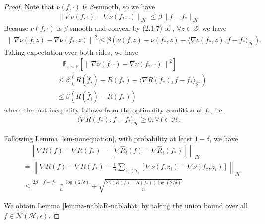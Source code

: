 \documentclass{article}
\begin{document}
\begin{proof}
  Note that $\nu(f,\cdot)$ is $\beta$-smooth,
  so we have
  \begin{align}
    \|\nabla\nu(f,\cdot)-\nabla\nu(f_\ast,\cdot)\|_\mathcal{H} \leq \beta\|f-f_\ast\|_\mathcal{H}
  \end{align}
  Because $\nu(f,\cdot)$ is $\beta$-smooth and convex, by (2.1.7) of \cite{Nesterov2004},
  $\forall z\in\mathcal{Z}$,
  we have
  \begin{align*}
   \left\|\nabla\nu (f,z)-\nabla \nu (f_\ast,z)\right\|^2
    \leq
    \beta\left(\nu (f,z)-\nu (f_\ast,z)
    -\langle \nabla\nu (f_\ast,z), f-f_\ast\rangle_\mathcal{H} \right).
  \end{align*}
  Taking expectation over both sides, we have
  \begin{align*}
    &~~~~\mathbb{E}_{z\sim\mathbb{P}}[\left\|\nabla\nu (f,\cdot)-\nabla\nu (f_\ast,\cdot)\right\|^2]\\
    &\leq \beta \left(R(\hat{f}_i)-R(f_\ast)-\langle \nabla R(f_\ast), f-f_\ast\rangle_\mathcal{H}\right)\\
    &\leq \beta \left(R(\hat{f}_i)-R(f_\ast)\right)
  \end{align*}
  where the last inequality follows from the optimality condition of $f_\ast$, i.e.,
  \begin{align*}
    \langle \nabla R(f_\ast),f-f_\ast\rangle_\mathcal{H} \geq 0,\forall f\in\mathcal{H}.
  \end{align*}

Following Lemma \ref{lem-nonequation}, with probability at least $1-\delta$, we have
\begin{align*}
  &~~~~\left\|
  \nabla R(f)-\nabla R(f_\ast)-[\nabla \hat{R}_i(f)-\nabla \hat{R}_i(f_\ast)]
  \right\|_\mathcal{H}\\
  &=\left\|
    \nabla R(f)-\nabla R(f_\ast)
    -\frac{1}{n}\sum_{z_i\in \mathcal{S}_i}
    \left[\nabla \nu(f,z_i)-\nabla \nu(f_\ast,z_i)\right]
  \right\|_\mathcal{H}\\
  &\leq \frac{2\beta\|f-f_\ast\|_\mathcal{H}\log(2/\delta)}{n}+\sqrt{\frac{2\beta(R(f)-R(f_\ast))\log (2/\delta)}{n}}
\end{align*}

We obtain Lemma \ref{lemma-nablaR-nablahat} by taking the union bound over all $f\in\mathcal{N}(\mathcal{H},\epsilon)$.
\end{proof}
\end{document}
